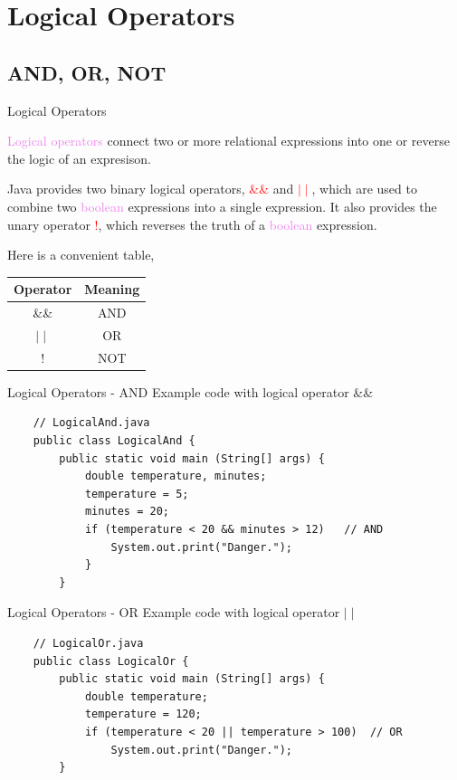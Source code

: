 \documentclass[11pt]{beamer}
\newcommand{\red}[1]{\textcolor{red}{#1}}
\newcommand{\violet}[1]{\textcolor{violet}{#1}}
\begin{document}
\section{Logical Operators}
\subsection{AND, OR, NOT}
\begin{frame}{Logical Operators}
    \begin{center}
        \violet{Logical operators} connect two or more relational expressions into one or reverse the logic of an expresison.
    \end{center}
    Java provides two binary logical operators, \red{\&\&} and \red{$\mid \mid$}, which are used to combine two \violet{boolean} expressions into a single expression. It also provides the unary operator \red{!}, which reverses the truth of a \violet{boolean} expression.
    \vspace{1em}

    Here is a convenient table,
    \begin{table}[]
    \begin{tabular}{|c|c|}
    \hline
    Operator & Meaning \\ \hline
    \&\&     & AND     \\ \hline
    $\mid \mid$        & OR      \\ \hline
    !        & NOT     \\ \hline
    \end{tabular}
    \end{table}
\end{frame}

\begin{frame}[fragile]{Logical Operators - AND}
    Example code with logical operator \&\& 
    \begin{lstlisting}
    // LogicalAnd.java
    public class LogicalAnd {
    	public static void main (String[] args) {
    		double temperature, minutes;
    		temperature = 5;
    		minutes = 20;
    		if (temperature < 20 && minutes > 12)	// AND
    			System.out.print("Danger.");
    		}
        }
    \end{lstlisting}
\end{frame}

\begin{frame}[fragile]{Logical Operators - OR}
    Example code with logical operator $\mid \mid$
    \begin{lstlisting}
    // LogicalOr.java
    public class LogicalOr {
    	public static void main (String[] args) {
    		double temperature;
    		temperature = 120;
    		if (temperature < 20 || temperature > 100)	// OR
    			System.out.print("Danger.");
        }
    \end{lstlisting}
\end{frame}
\end{document}
